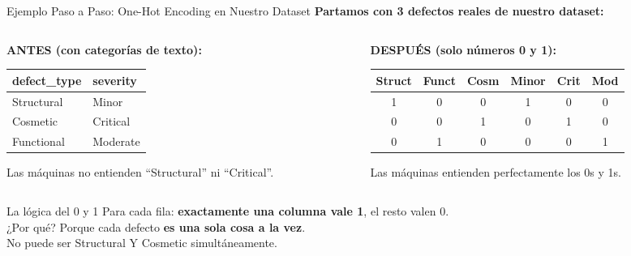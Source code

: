 \documentclass[aspectratio=169]{beamer}
\begin{document}
\begin{frame}{Ejemplo Paso a Paso: One-Hot Encoding en Nuestro Dataset}
  \small
  \textbf{Partamos con 3 defectos reales de nuestro dataset:}
  \vspace{0.2cm}

  \begin{columns}[T]
    \begin{column}{0.48\textwidth}
      \textbf{ANTES (con categorías de texto):}
      \vspace{4pt}
      \par{\footnotesize
      \begin{tabular}{|l|l|}
        \hline
        \textbf{defect\_type} & \textbf{severity} \\\hline
        Structural & Minor \\
        Cosmetic & Critical \\
        Functional & Moderate \\\hline
      \end{tabular}}

      \vspace{0.3cm}
      \small Las máquinas no entienden ``Structural'' ni ``Critical''.
    \end{column}
    \begin{column}{0.48\textwidth}
      \textbf{DESPUÉS (solo números 0 y 1):}
      \vspace{4pt}
      \par{\tiny
      \begin{tabular}{|c|c|c|c|c|c|}
        \hline
        \textbf{Struct} & \textbf{Funct} & \textbf{Cosm} & \textbf{Minor} & \textbf{Crit} & \textbf{Mod} \\\hline
        1 & 0 & 0 & 1 & 0 & 0 \\
        0 & 0 & 1 & 0 & 1 & 0 \\
        0 & 1 & 0 & 0 & 0 & 1 \\\hline
      \end{tabular}}

      \vspace{0.15cm}
      \small Las máquinas entienden perfectamente los 0s y 1s.
    \end{column}
  \end{columns}

  \vspace{0.3cm}
  \begin{alertblock}{\faLightbulb\enspace La lógica del 0 y 1}
    \centering\small
    Para cada fila: \textbf{exactamente una columna vale 1}, el resto valen 0.\\
    ¿Por qué? Porque cada defecto \textbf{es una sola cosa a la vez}.\\
    No puede ser Structural Y Cosmetic simultáneamente.
  \end{alertblock}
\end{frame}
\end{document}
